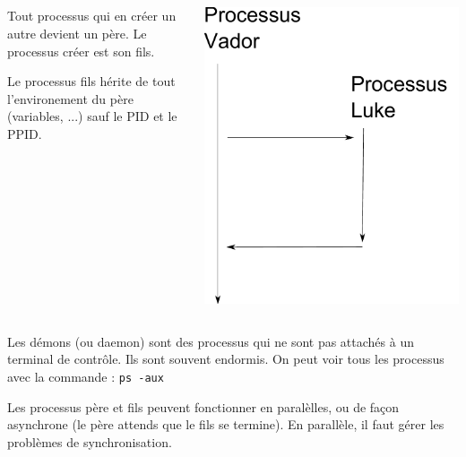\subsection{\subsectitle}
\begin{frame}{\sectitle}

\begin{columns}[c]
\begin{block}{\subsectitle}
Tout processus qui en créer un autre devient un père. Le processus créer est son fils.

Le processus fils hérite de tout l'environement du père (variables,  ...) sauf le PID et le PPID.
\end{block}
\includegraphics[width=\textwidth]{images/PereFils.pdf}
\end{columns}
\end{frame}

\begin{frame}{\sectitle}
\begin{block}{\subsectitle}
Les démons (ou daemon) sont des processus qui ne sont pas attachés à un terminal de contrôle. Ils sont souvent endormis.
On peut voir tous les processus avec la commande : \verb!ps -aux!
\end{block}

\begin{block}{\subsectitle}
Les processus père et fils peuvent fonctionner en paralèlles, ou de façon asynchrone (le père attends que le fils se termine).
En parallèle, il faut gérer les problèmes de synchronisation.
\end{block}
\end{frame}


